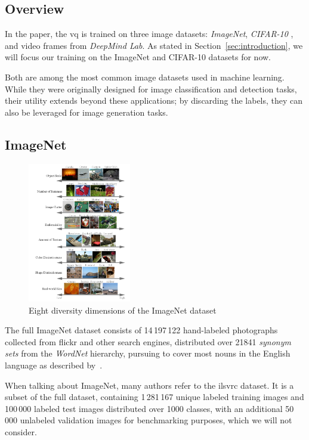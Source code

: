 \subsection{Overview}\label{subsec:dataset-overview}
In the paper, the \ac{vq} is trained on three image datasets: \textit{ImageNet}, \textit{CIFAR-10}
, and video frames from \textit{DeepMind Lab}.
As stated in Section~\ref{sec:introduction}, we will focus our training on the ImageNet and CIFAR-10
datasets for now.

Both are among the most common image datasets used in machine learning.
While they were originally designed for image classification and detection tasks, their utility extends beyond
these applications; by discarding the labels, they can also be leveraged for image generation tasks.

\subsection{ImageNet}\label{subsec:imagenet}

\begin{figure}
    \centering
    \includegraphics[width=0.4\textwidth]{../../sample_images/imnet_dimension}
    \caption{Eight diversity dimensions of the ImageNet dataset~\cite{imagenet_breakdown}}
    \label{fig:imnet_dimensions}
\end{figure}

The full ImageNet dataset consists of 14\,197\,122 hand-labeled photographs collected from flickr and other search
engines, distributed over 21841 \textit{synonym sets} from the
\textit{WordNet} hierarchy, pursuing to cover most nouns in the English language as described by~\cite{wordnet}.

When talking about ImageNet, many authors refer to the \ac{ilsvrc} dataset.
It is a subset of the full dataset, containing 1\,281\,167 unique labeled training images and 100\,000 labeled test
images distributed over 1000 classes, with an additional 50\,000 unlabeled validation images for benchmarking
purposes, which we will not consider.

